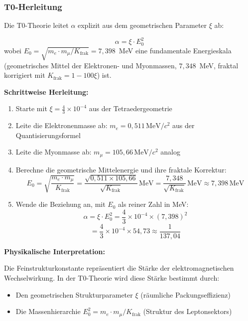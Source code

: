 	\subsubsection{T0-Herleitung}
	
	Die T0-Theorie leitet $\alpha$ explizit aus dem geometrischen Parameter $\xi$ ab:
	
	\begin{keyresult}
		\[
		\alpha = \xi \cdot E_0^2
		\]
		wobei $E_0 = \sqrt{m_e \cdot m_\mu/K_{\text{frak}}} = 7{,}398$~MeV eine fundamentale Energieskala (geometrisches Mittel der Elektronen- und Myonmassen, $7{,}348$~MeV, fraktal korrigiert mit $K_{\text{frak}} = 1 - 100\xi$) ist.
	\end{keyresult}
	
	\textbf{Schrittweise Herleitung:}
	
	\begin{enumerate}
		\item Starte mit $\xi = \frac{4}{3} \times 10^{-4}$ aus der Tetraedergeometrie
		
		\item Leite die Elektronenmasse ab: $m_e = 0{,}511\,\text{MeV}/c^2$ aus der Quantisierungsformel
		
		\item Leite die Myonmasse ab: $m_\mu = 105{,}66\,\text{MeV}/c^2$ analog
		
		\item Berechne die geometrische Mittelenergie und ihre fraktale Korrektur:
		\[
		E_0 = \sqrt{\frac{m_e \cdot m_\mu}{K_{\text{frak}}}} = \frac{\sqrt{0{,}511 \times 105{,}66}}{\sqrt{K_{\text{frak}}}}\,\text{MeV} = \frac{7{,}348}{\sqrt{K_{\text{frak}}}}\,\text{MeV} \approx 7{,}398\,\text{MeV}
		\]
		
		\item Wende die Beziehung an, mit $E_0$ als reiner Zahl in MeV:
		\[
		\alpha = \xi \cdot E_0^2 = \frac{4}{3} \times 10^{-4} \times (7{,}398)^2
		\]
		\[
		= \frac{4}{3} \times 10^{-4} \times 54{,}73 \approx \frac{1}{137{,}04}
		\]
	\end{enumerate}
	
	\textbf{Physikalische Interpretation:}
	
	Die Feinstrukturkonstante repräsentiert die Stärke der elektromagnetischen Wechselwirkung. In der T0-Theorie wird diese Stärke bestimmt durch:
	\begin{itemize}
		\item Den geometrischen Strukturparameter $\xi$ (räumliche Packungseffizienz)
		\item Die Massenhierarchie $E_0^2 = m_e \cdot m_\mu/K_{\text{frak}}$ (Struktur des Leptonsektors)
	\end{itemize}
	
